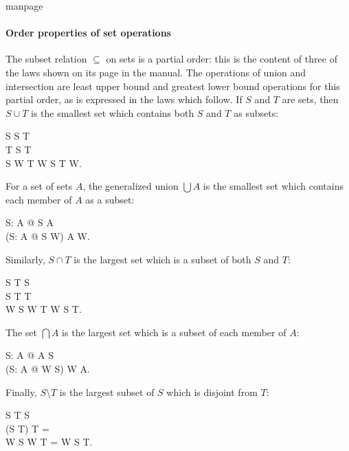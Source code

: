 \begin{pagestyle}{manpage}
\paragraph{Order properties of set operations}\label{p:80}

The subset relation $\subseteq$ on sets is a partial
order: this is the content of three of the laws
shown on its page in the manual.  The operations of union and
intersection are least upper bound and
greatest lower bound operations for this
partial order, as is expressed in the laws which follow.  If $S$ and
$T$ are sets, then $S \cup T$ is the smallest set which contains both
$S$ and $T$ as subsets:
\begin{laws}
       S \subseteq S \cup T \\
       T \subseteq S \cup T \\
       S \subseteq W \land T \subseteq W
		\implies S \cup T \subseteq W.
\end{laws}
For a set of sets $A$, the generalized union $\bigcup A$ is the smallest
set which contains each member of $A$ as a subset:
\begin{laws}
       \forall S: A @ S \subseteq \bigcup A \\
       (\forall S: A @ S \subseteq W) 
		\implies \bigcup A \subseteq W.
\end{laws}
Similarly, $S \cap T$ is the largest set which is a subset of
both $S$ and $T$:
\begin{laws}
       S \cap T \subseteq S \\
       S \cap T \subseteq T \\
       W \subseteq S \land W \subseteq T 
		\implies W \subseteq S \cap T.
\end{laws}
The set $\bigcap A$ is the largest set which is a subset of each
member of $A$:
\begin{laws}
       \forall S: A @ \bigcap A \subseteq S \\
       (\forall S: A @ W \subseteq S) \implies W \subseteq \bigcap A.
\end{laws}
Finally, $S \setminus T$ is the largest subset of $S$ which is
disjoint from $T$:
\begin{laws}
       S \setminus T \subseteq S \\
       (S \setminus T) \cap T = \empty \\
       W \subseteq S \land W \cap T = \empty \implies %
                W \subseteq S \setminus T.
\end{laws}
\newpage
\end{pagestyle}
